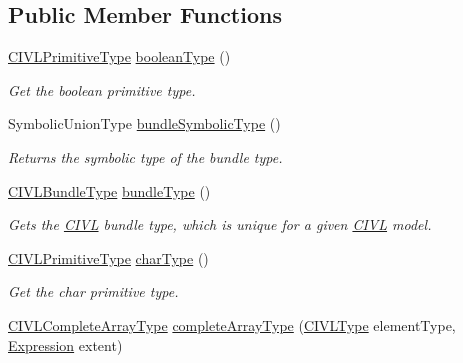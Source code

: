 \subsection*{Public Member Functions}
\begin{DoxyCompactItemize}
\item 
\hyperlink{interfaceedu_1_1udel_1_1cis_1_1vsl_1_1civl_1_1model_1_1IF_1_1type_1_1CIVLPrimitiveType}{C\+I\+V\+L\+Primitive\+Type} \hyperlink{interfaceedu_1_1udel_1_1cis_1_1vsl_1_1civl_1_1model_1_1IF_1_1CIVLTypeFactory_a986698b91843b55b50a111614ddaee00}{boolean\+Type} ()
\begin{DoxyCompactList}\small\item\em Get the boolean primitive type. \end{DoxyCompactList}\item 
Symbolic\+Union\+Type \hyperlink{interfaceedu_1_1udel_1_1cis_1_1vsl_1_1civl_1_1model_1_1IF_1_1CIVLTypeFactory_a0e7ed6c6108da960abec6537d78f6047}{bundle\+Symbolic\+Type} ()
\begin{DoxyCompactList}\small\item\em Returns the symbolic type of the bundle type. \end{DoxyCompactList}\item 
\hyperlink{interfaceedu_1_1udel_1_1cis_1_1vsl_1_1civl_1_1model_1_1IF_1_1type_1_1CIVLBundleType}{C\+I\+V\+L\+Bundle\+Type} \hyperlink{interfaceedu_1_1udel_1_1cis_1_1vsl_1_1civl_1_1model_1_1IF_1_1CIVLTypeFactory_a6f39e2e540a2c398a2491809304561e9}{bundle\+Type} ()
\begin{DoxyCompactList}\small\item\em Gets the \hyperlink{classedu_1_1udel_1_1cis_1_1vsl_1_1civl_1_1CIVL}{C\+I\+V\+L} bundle type, which is unique for a given \hyperlink{classedu_1_1udel_1_1cis_1_1vsl_1_1civl_1_1CIVL}{C\+I\+V\+L} model. \end{DoxyCompactList}\item 
\hyperlink{interfaceedu_1_1udel_1_1cis_1_1vsl_1_1civl_1_1model_1_1IF_1_1type_1_1CIVLPrimitiveType}{C\+I\+V\+L\+Primitive\+Type} \hyperlink{interfaceedu_1_1udel_1_1cis_1_1vsl_1_1civl_1_1model_1_1IF_1_1CIVLTypeFactory_ae23f8ae8d56490c3dd5b7bd6b03aab32}{char\+Type} ()
\begin{DoxyCompactList}\small\item\em Get the char primitive type. \end{DoxyCompactList}\item 
\hyperlink{interfaceedu_1_1udel_1_1cis_1_1vsl_1_1civl_1_1model_1_1IF_1_1type_1_1CIVLCompleteArrayType}{C\+I\+V\+L\+Complete\+Array\+Type} \hyperlink{interfaceedu_1_1udel_1_1cis_1_1vsl_1_1civl_1_1model_1_1IF_1_1CIVLTypeFactory_a79570f457ac5c9416469727fe21ad959}{complete\+Array\+Type} (\hyperlink{interfaceedu_1_1udel_1_1cis_1_1vsl_1_1civl_1_1model_1_1IF_1_1type_1_1CIVLType}{C\+I\+V\+L\+Type} element\+Type, \hyperlink{interfaceedu_1_1udel_1_1cis_1_1vsl_1_1civl_1_1model_1_1IF_1_1expression_1_1Expression}{Expression} extent)

\end{DoxyCompactItemize}
